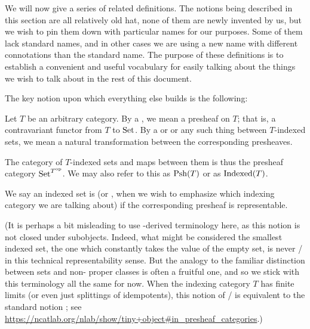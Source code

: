 We will now give a series of related definitions. The notions being described in this section are all relatively old hat, none of them are newly invented by us, but we wish to pin them down with particular names for our purposes. Some of them lack standard names, and in other cases we are using a new name with different connotations than the standard name. The purpose of these definitions is to establish a convenient and useful vocabulary for easily talking about the things we wish to talk about in the rest of this document.


The key notion upon which everything else builds is the following:

\begin{definition}
Let $T$ be an arbitrary category. By a , we mean a presheaf on $T$; that is, a contravariant functor from $T$ to $\mathrm{Set}$. By a  or  or any such thing between $T$-indexed sets, we mean a natural transformation between the corresponding presheaves.
\end{definition}

\begin{definition}
The category of $T$-indexed sets and maps between them is thus the presheaf category $\mathrm{Set}^{T^{\mathrm{op}}}$. We may also refer to this as $\operatorname{Psh}(T)$ or as $\operatorname{Indexed}(T)$.
\end{definition}

\begin{definition}
We say an indexed set is  (or , when we wish to emphasize which indexing category we are talking about) if the corresponding presheaf is representable. 
\end{definition}

(It is perhaps a bit misleading to use -derived terminology here, as this notion is not closed under subobjects. Indeed, what might be considered the smallest indexed set, the one which constantly takes the value of the empty set, is never \repsmall/ in this technical representability sense. But the analogy to the familiar distinction between  sets and non- proper classes is often a fruitful one, and so we stick with this terminology all the same for now. When the indexing category $T$ has finite limits (or even just splittings of idempotents), this notion of \repsmall/ is equivalent to the standard notion ; see \url{https://ncatlab.org/nlab/show/tiny+object#in_presheaf_categories}.)

